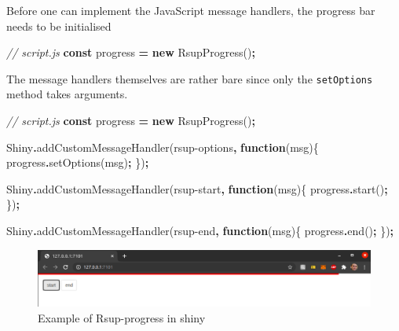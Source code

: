 \documentclass[
]{krantz}
\makeatletter
\newenvironment{Shaded}{\begin{snugshade}}{\end{snugshade}}
\newcommand{\CommentTok}[1]{\textcolor[rgb]{0.37,0.37,0.37}{\textit{#1}}}
\newcommand{\FunctionTok}[1]{\textcolor[rgb]{0,0,0}{#1}}
\newcommand{\KeywordTok}[1]{\textcolor[rgb]{0.27,0.27,0.27}{\textbf{#1}}}
\newcommand{\NormalTok}[1]{#1}
\newcommand{\OperatorTok}[1]{\textcolor[rgb]{0.43,0.43,0.43}{\textbf{#1}}}
\newcommand{\StringTok}[1]{\textcolor[rgb]{0.5,0.5,0.5}{#1}}
\newenvironment{kframe}{%
\medskip{}
\setlength{\fboxsep}{.8em}
 \def\at@end@of@kframe{}%
 \ifinner\ifhmode%
  \def\at@end@of@kframe{\end{minipage}}%
  \begin{minipage}{\columnwidth}%
 \fi\fi%
 \def\FrameCommand##1{\hskip\@totalleftmargin \hskip-\fboxsep
 \colorbox{shadecolor}{##1}\hskip-\fboxsep
     \hskip-\linewidth \hskip-\@totalleftmargin \hskip\columnwidth}%
 \MakeFramed {\advance\hsize-\width
   \@totalleftmargin\z@ \linewidth\hsize
   \@setminipage}}%
 {\par\unskip\endMakeFramed%
 \at@end@of@kframe}
\renewenvironment{Shaded}{\begin{kframe}}{\end{kframe}}
\makeatother
\begin{document}
Before one can implement the JavaScript message handlers, the progress bar needs to be initialised

\begin{Shaded}
\begin{Highlighting}[]
\CommentTok{// script.js}
\KeywordTok{const}\NormalTok{ progress }\OperatorTok{=} \KeywordTok{new}\NormalTok{ RsupProgress()}\OperatorTok{;}
\end{Highlighting}
\end{Shaded}

The message handlers themselves are rather bare since only the \texttt{setOptions} method takes arguments.

\begin{Shaded}
\begin{Highlighting}[]
\CommentTok{// script.js}
\KeywordTok{const}\NormalTok{ progress }\OperatorTok{=} \KeywordTok{new}\NormalTok{ RsupProgress()}\OperatorTok{;}

\NormalTok{Shiny}\OperatorTok{.}\FunctionTok{addCustomMessageHandler}\NormalTok{(}\StringTok{\textquotesingle{}rsup{-}options\textquotesingle{}}\OperatorTok{,} \KeywordTok{function}\NormalTok{(msg)\{}
\NormalTok{  progress}\OperatorTok{.}\FunctionTok{setOptions}\NormalTok{(msg)}\OperatorTok{;}
\NormalTok{\})}\OperatorTok{;}

\NormalTok{Shiny}\OperatorTok{.}\FunctionTok{addCustomMessageHandler}\NormalTok{(}\StringTok{\textquotesingle{}rsup{-}start\textquotesingle{}}\OperatorTok{,} \KeywordTok{function}\NormalTok{(msg)\{}
\NormalTok{  progress}\OperatorTok{.}\FunctionTok{start}\NormalTok{()}\OperatorTok{;}
\NormalTok{\})}\OperatorTok{;}

\NormalTok{Shiny}\OperatorTok{.}\FunctionTok{addCustomMessageHandler}\NormalTok{(}\StringTok{\textquotesingle{}rsup{-}end\textquotesingle{}}\OperatorTok{,} \KeywordTok{function}\NormalTok{(msg)\{}
\NormalTok{  progress}\OperatorTok{.}\FunctionTok{end}\NormalTok{()}\OperatorTok{;}
\NormalTok{\})}\OperatorTok{;}
\end{Highlighting}
\end{Shaded}

\begin{figure}
\centering
\includegraphics{images/rsup.png}
\caption{Example of Rsup-progress in shiny}
\end{figure}
\end{document}
